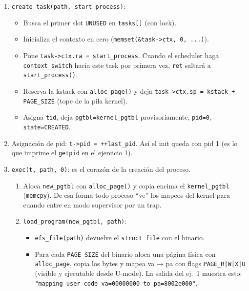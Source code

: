 \documentclass[11pt,a4paper]{article}
\begin{document}
\begin{enumerate}[leftmargin=1.6em]
    \item \texttt{create\_task(path, start\_process)}:
    \begin{itemize}[leftmargin=1.2em]
        \item Busca el primer slot \texttt{UNUSED} en \texttt{tasks[]} (con lock).
        \item Inicializa el contexto en cero
        (\texttt{memset(\&task->ctx, 0, ...)}).
        \item Pone \texttt{task->ctx.ra = start\_process}. Cuando el scheduler
        haga \texttt{context\_switch} hacia este task por primera vez,
        \texttt{ret} saltará a \texttt{start\_process()}.
        \item Reserva la kstack con \texttt{alloc\_page()} y deja
        \texttt{task->ctx.sp = kstack + PAGE\_SIZE} (tope de la pila kernel).
        \item Asigna \texttt{tid}, deja \texttt{pgtbl=kernel\_pgtbl}
        provisoriamente, \texttt{pid=0}, \texttt{state=CREATED}.
    \end{itemize}
    \item Asignación de pid: \texttt{t->pid = ++last\_pid}. Así el init queda con
    pid 1 (es lo que imprime el \texttt{getpid} en el ejercicio 1).
    \item \texttt{exec(t, path, 0)}: es el corazón de la creación del proceso.
    \begin{enumerate}[label=\alph*),leftmargin=1.4em]
        \item Aloca \texttt{new\_pgtbl} con \texttt{alloc\_page()} y copia encima
        el \texttt{kernel\_pgtbl} (\texttt{memcpy}). De esa forma todo proceso
        ``ve'' los mapeos del kernel para cuando entre en modo supervisor por un
        trap.
        \item \texttt{load\_program(new\_pgtbl, path)}:
        \begin{itemize}[leftmargin=1.2em]
            \item \texttt{efs\_file(path)} devuelve el \texttt{struct file} con el
            binario.
            \item Para cada \texttt{PAGE\_SIZE} del binario aloca una página física
            con \texttt{alloc\_page}, copia los bytes y mapea va → pa con flags
            \texttt{PAGE\_R|W|X|U} (visible y ejecutable desde U-mode). La salida
            del ej.\ 1 muestra esto: \texttt{"mapping user code va=00000000 to
            pa=8002e000"}.
        \end{itemize}

\end{enumerate}
\end{enumerate}
\end{document}

